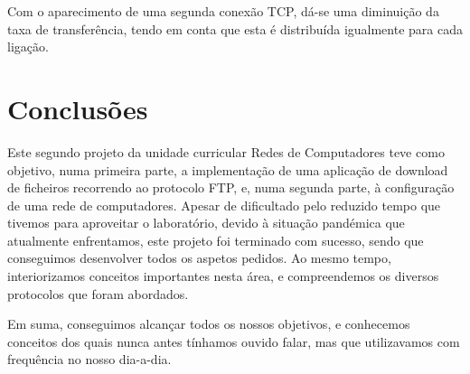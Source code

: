 \documentclass[article, a4paper, 11pt, oneside]{memoir}
\begin{document}
Com o aparecimento de uma segunda conexão TCP, dá-se uma diminuição da taxa de transferência, tendo em conta que esta é distribuída igualmente para cada ligação.

\chapter[Conclusões][Conclusões]{Conclusões} \label{\thechapter}

Este segundo projeto da unidade curricular Redes de Computadores teve como objetivo, numa primeira parte, a implementação de uma aplicação de download de ficheiros recorrendo ao protocolo FTP,
e, numa segunda parte, à configuração de uma rede de computadores. Apesar de dificultado pelo reduzido tempo que tivemos para aproveitar o laboratório, devido à situação pandémica que atualmente enfrentamos,
este projeto foi terminado com sucesso, sendo que conseguimos desenvolver todos os aspetos pedidos.
Ao mesmo tempo, interiorizamos conceitos importantes nesta área, e compreendemos os diversos protocolos que foram abordados.

Em suma, conseguimos alcançar todos os nossos objetivos, e conhecemos conceitos dos quais nunca antes tínhamos ouvido falar, mas que utilizavamos com frequência no nosso dia-a-dia.
\end{document}
